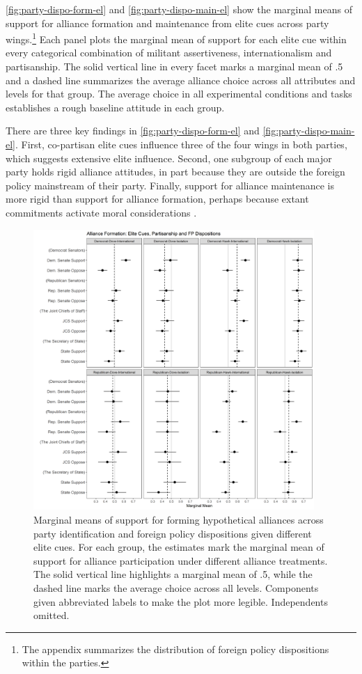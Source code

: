 \documentclass[12pt]{article}
\begin{document}
\autoref{fig:party-dispo-form-el} and \autoref{fig:party-dispo-main-el} show the marginal means of support for alliance formation and maintenance from elite cues across party wings.\footnote{The appendix summarizes the distribution of foreign policy dispositions within the parties.} 
Each panel plots the marginal mean of support for each elite cue within every categorical combination of militant assertiveness, internationalism and partisanship.
The solid vertical line in every facet marks a marginal mean of .5 and a dashed line summarizes the average alliance choice across all attributes and levels for that group.
The average choice in all experimental conditions and tasks establishes a rough baseline attitude in each group.  


There are three key findings in \autoref{fig:party-dispo-form-el} and \autoref{fig:party-dispo-main-el}. 
First, co-partisan elite cues influence three of the four wings in both parties, which suggests extensive elite influence. 
Second, one subgroup of each major party holds rigid alliance attitudes, in part because they are outside the foreign policy mainstream of their party.  
Finally, support for alliance maintenance is more rigid than support for alliance formation, perhaps because extant commitments activate moral considerations \citep{TomzWeeks2021}. 


\begin{figure}[htpb]
	\centering
		\includegraphics[width=0.95\textwidth]{../figures/party-dispo-form-el.png}
	\caption{Marginal means of support for forming hypothetical alliances across party identification and foreign policy dispositions given different elite cues. For each group, the estimates mark the marginal mean of support for alliance participation under different alliance treatments. The solid vertical line highlights a marginal mean of .5, while the dashed line marks the average choice across all levels. Components given abbreviated labels to make the plot more legible. Independents omitted.}
	\label{fig:party-dispo-form-el}
\end{figure}
\end{document}

